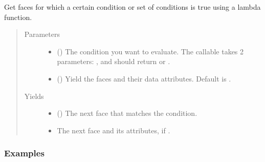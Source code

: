 \documentclass[letterpaper,10pt,english]{sphinxmanual}
\begin{document}
\begin{fulllineitems}
\begin{fulllineitems}
\label{\detokenize{api/generated/directional_clustering.mesh.MeshPlus.faces_where_predicate:directional_clustering.mesh.MeshPlus.faces_where_predicate}}
Get faces for which a certain condition or set of conditions is true using a lambda function.
\begin{quote}\begin{description}
\item[{Parameters}] \leavevmode\begin{itemize}
\item {} 
 () \textendash{} The condition you want to evaluate. The callable takes 2 parameters: ,  and should return  or .

\item {} 
 () \textendash{} Yield the faces and their data attributes.
Default is .

\end{itemize}

\item[{Yields}] \leavevmode\begin{itemize}
\item {} 
 () \textendash{} The next face that matches the condition.

\item {} 
 \textendash{} The next face and its attributes, if .

\end{itemize}

\end{description}\end{quote}
\subsubsection*{Examples}

\begin{sphinxVerbatim}[commandchars=\\\{\}]
\end{sphinxVerbatim}


\end{fulllineitems}
\end{fulllineitems}
\end{document}
